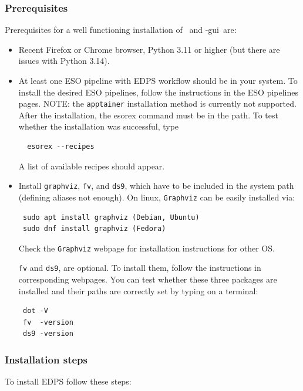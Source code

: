 
\subsubsection{Prerequisites}
Prerequisites for a well functioning installation of \edps\ and \edps-gui\ are:

\begin{itemize}
\item    Recent Firefox or Chrome browser, Python 3.11 or higher (but there are issues with Python 3.14).

\item At least one ESO pipeline with EDPS workflow should be in your
  system. To install the desired ESO pipelines, follow the
  instructions in the ESO pipelines pages. NOTE: the {\tt apptainer}
  installation method is currently not supported. After the
  installation, the esorex command must be in the path. To test
  whether the installation was successful, type
\begin{verbatim}
  esorex --recipes 
\end{verbatim}

A list of available recipes should appear.

\item Install {\tt graphviz}, {\tt fv}, and {\tt ds9}, which have to
  be included in the system path (defining aliases not
  enough). On linux, {\tt Graphviz} can be easily installed via:

\begin{verbatim}
 sudo apt install graphviz (Debian, Ubuntu)
 sudo dnf install graphviz (Fedora)
\end{verbatim}
Check the {\tt Graphviz} webpage for installation instructions for other OS.

{\tt fv} and {\tt ds9}, are optional. To install them, follow the
instructions in corresponding webpages. You can test whether these
three packages are installed and their paths are correctly set by
typing on a terminal:

\begin{verbatim}
 dot -V
 fv  -version
 ds9 -version
\end{verbatim}
\end{itemize}

\subsubsection{Installation steps}

To install EDPS follow these steps:

